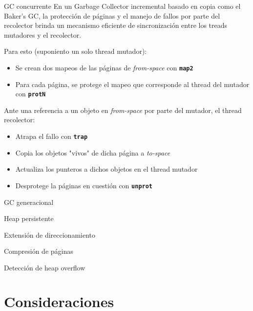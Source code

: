 \documentclass[xcolor=pdftex,dvipsnames,usenames,table]{beamer}
\begin{document}
\begin{frame}{GC concurrente}
\pause En un Garbage Collector incremental basado en copia como el Baker's GC, la protección de páginas y el manejo de fallos por parte del recolector brinda un mecanismo eficiente de sincronización entre los treads mutadores y el recolector.

\pause Para esto (suponiento un solo thread mutador):
	\pause
	\begin{itemize}
		\item Se crean dos mapeos de las páginas de \emph{from-space} con \textbf{\texttt{map2}}
		\item Para cada página, se protege el mapeo que corresponde al thread del mutador con \textbf{\texttt{protN}}
	\end{itemize}

\pause Ante una referencia a un objeto en \emph{from-space} por parte del mutador, el thread recolector:
	\pause
	\begin{itemize}
		\item Atrapa el fallo con \textbf{\texttt{trap}}
		\item Copia los objetos "vivos" de dicha página a \emph{to-space}
		\item Actualiza los punteros a dichos objetos en el thread mutador
		\item Desprotege la páginas en cuestión con \textbf{\texttt{unprot}}
	\end{itemize}

\end{frame}

\begin{frame}{GC generacional}
\end{frame}

\begin{frame}{Heap persistente}
\end{frame}

\begin{frame}{Extensión de direccionamiento}
\end{frame}

\begin{frame}{Compresión de páginas}
\end{frame}

\begin{frame}{Detección de heap overflow}
\end{frame}

\section{Consideraciones}
\end{document}
